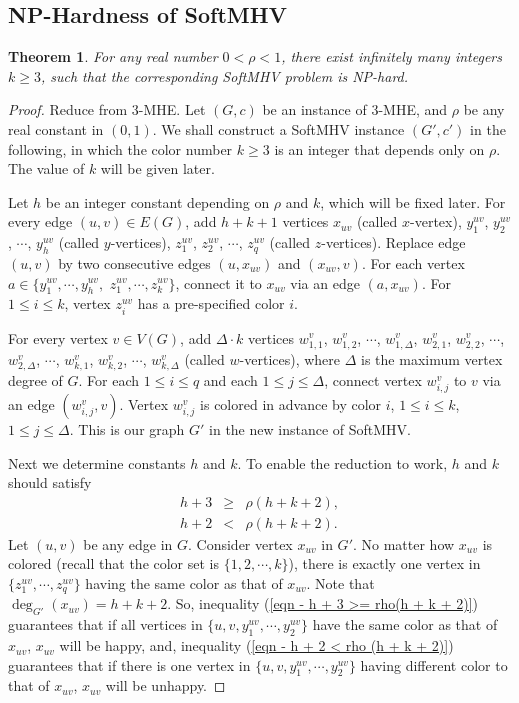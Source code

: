 \documentclass[11pt]{article}
\newtheorem{theorem}{Theorem}[section]
\begin{document}
\subsection{NP-Hardness of SoftMHV}
\begin{theorem}
For any real number $0 < \rho < 1$, there exist infinitely many integers
$k \geq 3$, such that the corresponding SoftMHV problem is NP-hard.
\end{theorem}
\begin{proof}
Reduce from 3-MHE. Let $(G, c)$ be an instance of 3-MHE, and $\rho$ be any
real constant in $(0, 1)$. We shall construct a SoftMHV instance
$(G', c')$ in the following, in which the color number $k \geq 3$ is an integer
that depends only on $\rho$. The value of $k$ will be given later.

Let $h$ be an integer constant depending on $\rho$ and $k$, which will be
fixed later.
For every edge $(u, v) \in E(G)$, add $h+k+1$ vertices $x_{uv}$ (called
$x$-vertex), $y_1^{uv}$, $y_2^{uv}$, $\cdots$, $y_h^{uv}$ (called $y$-vertices),
$z_1^{uv}$, $z_2^{uv}$, $\cdots$, $z_q^{uv}$ (called $z$-vertices).
Replace edge $(u, v)$ by two consecutive edges $(u, x_{uv})$
and $(x_{uv}, v)$. For each vertex $a \in \{y_1^{uv}, \cdots, y_h^{uv},$
$z_1^{uv}, \cdots, z_k^{uv} \}$, connect it to $x_{uv}$ via an edge
$(a, x_{uv})$.
For $1 \leq i \leq k$, vertex $z_i^{uv}$ has a pre-specified color $i$.

For every vertex $v \in V(G)$, add $\Delta \cdot k$ vertices $w_{1,1}^v$,
$w_{1,2}^v$, $\cdots$, $w_{1,\Delta}^v$, $w_{2,1}^v$, $w_{2,2}^v$, $\cdots$,
$w_{2, \Delta}^v$, $\cdots$, $w_{k,1}^v$, $w_{k,2}^v$, $\cdots$,
$w_{k,\Delta}^v$ (called $w$-vertices), where $\Delta$ is the maximum vertex
degree of $G$.
For each $1 \leq i \leq q$ and each $1 \leq j \leq \Delta$, connect vertex
$w_{i,j}^v$ to $v$ via an edge $(w_{i, j}^v, v)$. Vertex $w_{i,j}^v$ is
colored in advance by color $i$, $1 \leq i \leq k$, $1 \leq j \leq \Delta$.
This is our graph $G'$ in the new instance of SoftMHV.

Next we determine constants $h$ and $k$.
To enable the reduction to work, $h$ and $k$ should satisfy
\begin{eqnarray}
h + 3 &\geq& \rho (h + k + 2), \label{eqn - h + 3 >= rho(h + k + 2)}\\
h + 2 &<& \rho (h + k + 2). \label{eqn - h + 2 < rho (h + k + 2)}
\end{eqnarray}
Let $(u, v)$ be any edge in $G$. Consider vertex $x_{uv}$ in $G'$.
No matter how $x_{uv}$ is colored (recall that the color set is
$\{1, 2, \cdots, k\}$), there is exactly one vertex in
$\{z_1^{uv}, \cdots, z_q^{uv}\}$ having the same color as that of $x_{uv}$.
Note that $\deg_{G'}(x_{uv}) = h + k + 2$.
So, inequality (\ref{eqn - h + 3 >= rho(h + k + 2)}) guarantees that
if all vertices in $\{u, v, y_1^{uv}, \cdots, y_2^{uv}\}$ have the same
color as that of $x_{uv}$, $x_{uv}$ will be happy, and,
inequality (\ref{eqn - h + 2 < rho (h + k + 2)}) guarantees that
if there is one vertex in $\{u, v, y_1^{uv}, \cdots, y_2^{uv}\}$ having
different color to that of $x_{uv}$, $x_{uv}$ will be unhappy.


\end{proof}
\end{document}

